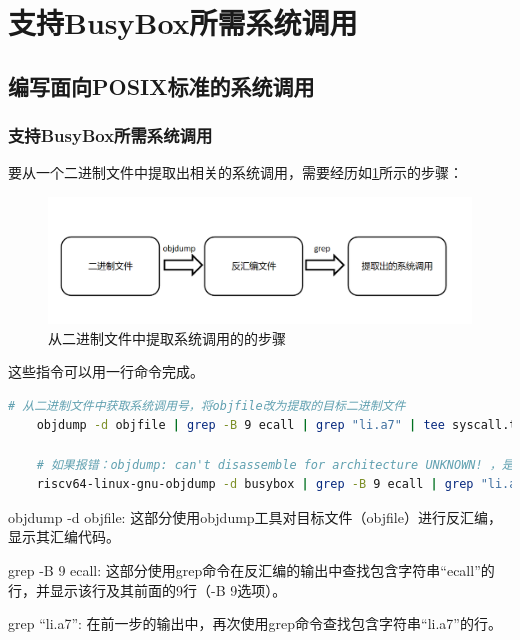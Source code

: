 \section{支持BusyBox所需系统调用}
\subsection{编写面向POSIX标准的系统调用}
\subsubsection{支持BusyBox所需系统调用}

要从一个二进制文件中提取出相关的系统调用，需要经历如\ref{fig:get syscall}所示的步骤：

\begin{figure}[htb]
    \centering
    \includegraphics[width=\textwidth]{figures/09-03-系统调用抽取.png}
    \caption{
        从二进制文件中提取系统调用的的步骤
    }
    \label{fig:get syscall}
\end{figure}

这些指令可以用一行命令完成。

\begin{lstlisting}[language=bash]
    # 从二进制文件中获取系统调用号，将objfile改为提取的目标二进制文件
    objdump -d objfile | grep -B 9 ecall | grep "li.a7" | tee syscall.txt

    # 如果报错：objdump: can't disassemble for architecture UNKNOWN! ，是由于当前的objdump并非RISC-V架构，尝试
    riscv64-linux-gnu-objdump -d busybox | grep -B 9 ecall | grep "li.a7" | tee syscall.txt

\end{lstlisting}

objdump -d objfile: 这部分使用objdump工具对目标文件（objfile）进行反汇编，显示其汇编代码。

grep -B 9 ecall: 这部分使用grep命令在反汇编的输出中查找包含字符串\enquote{ecall}的行，并显示该行及其前面的9行（-B 9选项）。

grep \enquote{li.a7}: 在前一步的输出中，再次使用grep命令查找包含字符串\enquote{li.a7}的行。

